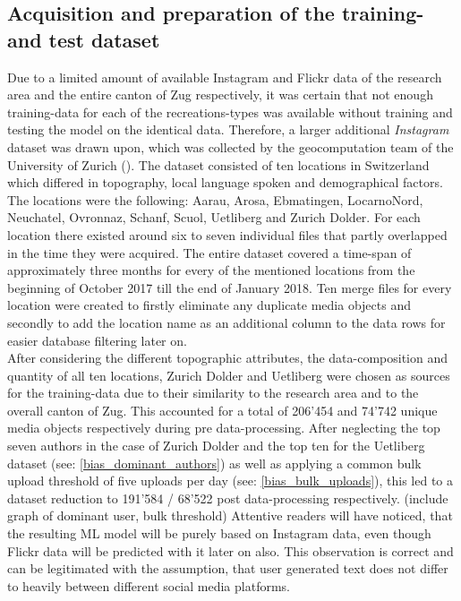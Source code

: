\subsection{Acquisition and preparation of the training- and test dataset} \label{preparation_training_data}
Due to a limited amount of available Instagram and Flickr data of the research area and the entire canton of Zug respectively, it was certain that not enough training-data for each of the recreations-types was available without training and testing the model on the identical data. Therefore, a larger additional \textit{Instagram} dataset was drawn upon, which was collected by the geocomputation team of the University of Zurich (\parencite{Gruzd2016}). The dataset consisted of ten locations in Switzerland which differed in topography, local language spoken and demographical factors. The locations were the following: Aarau, Arosa, Ebmatingen, LocarnoNord, Neuchatel, Ovronnaz, Schanf, Scuol, Uetliberg and Zurich Dolder. For each location there existed around six to seven individual files that partly overlapped in the time they were acquired. The entire dataset covered a time-span of approximately three months for every of the mentioned locations from the beginning of October 2017 till the end of January 2018.
Ten merge files for every location were created to firstly eliminate any duplicate media objects and secondly to add the location name as an additional column to the data rows for easier database filtering later on.\\
\newline
After considering the different topographic attributes, the data-composition and quantity of all ten locations, Zurich Dolder and Uetliberg were chosen as sources for the training-data due to their similarity to the research area and to the overall canton of Zug. This accounted for a total of 206'454 and 74'742 unique media objects respectively during pre data-processing. After neglecting the top seven authors in the case of Zurich Dolder and the top ten for the Uetliberg dataset (see: \ref{bias_dominant_authors}) as well as applying a common bulk upload threshold of five uploads per day (see: \ref{bias_bulk_uploads}), this led to a dataset reduction to 191'584 / 68'522 post data-processing respectively. (include graph of dominant user, bulk threshold) Attentive readers will have noticed, that the resulting ML model will be purely based on Instagram data, even though Flickr data will be predicted with it later on also. This observation is correct and can be legitimated with the assumption, that user generated text does not differ to heavily between different social media platforms.\\
